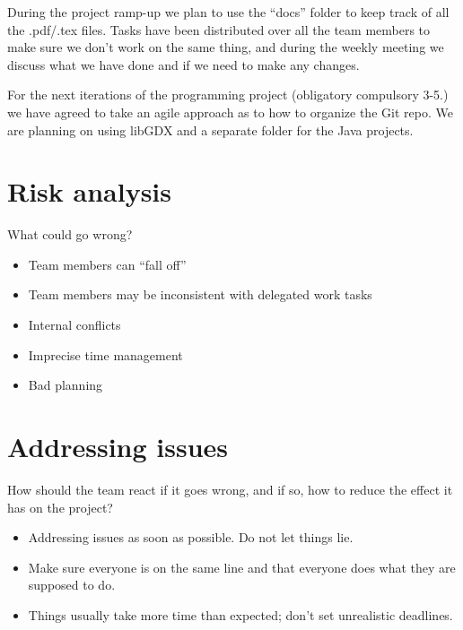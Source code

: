 \documentclass{article}
\begin{document}
During the project ramp-up we plan to use the “docs” folder to keep track of all the .pdf/.tex files. Tasks have been distributed over all the team members to make sure we don’t work on the same thing, and during the weekly meeting we discuss what we have done and if we need to make any changes.

For the next iterations of the programming project (obligatory compulsory 3-5.) we have agreed to take an agile approach as to how to organize the Git repo. We are planning on using libGDX and a separate folder for the Java projects.

\section*{Risk analysis}
What could go wrong?
\begin{itemize}
    \item Team members can “fall off”
    \item Team members may be inconsistent with delegated work tasks
    \item Internal conflicts
    \item Imprecise time management
    \item Bad planning
\end{itemize}

\section*{Addressing issues}
How should the team react if it goes wrong, and if so, how to reduce the effect it has on the project?
\begin{itemize}
    \item Addressing issues as soon as possible. Do not let things lie.
    \item Make sure everyone is on the same line and that everyone does what they are supposed to do.
    \item Things usually take more time than expected; don’t set unrealistic deadlines.
\end{itemize}
\end{document}
